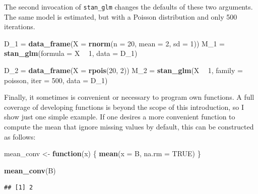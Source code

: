 \documentclass[]{svmono}
\newenvironment{Shaded}{\begin{snugshade}}{\end{snugshade}}
\newcommand{\KeywordTok}[1]{\textcolor[rgb]{0.13,0.29,0.53}{\textbf{#1}}}
\newcommand{\DataTypeTok}[1]{\textcolor[rgb]{0.13,0.29,0.53}{#1}}
\newcommand{\DecValTok}[1]{\textcolor[rgb]{0.00,0.00,0.81}{#1}}
\newcommand{\StringTok}[1]{\textcolor[rgb]{0.31,0.60,0.02}{#1}}
\newcommand{\OtherTok}[1]{\textcolor[rgb]{0.56,0.35,0.01}{#1}}
\newcommand{\ControlFlowTok}[1]{\textcolor[rgb]{0.13,0.29,0.53}{\textbf{#1}}}
\newcommand{\OperatorTok}[1]{\textcolor[rgb]{0.81,0.36,0.00}{\textbf{#1}}}
\newcommand{\NormalTok}[1]{#1}
\begin{document}
The second invocation of \texttt{stan\_glm} changes the defaults of
these two arguments. The same model is estimated, but with a Poisson
distribution and only 500 iterations.

\begin{Shaded}
\begin{Highlighting}[]
\NormalTok{D_}\DecValTok{1}\NormalTok{ =}\StringTok{ }\KeywordTok{data_frame}\NormalTok{(}\DataTypeTok{X =} \KeywordTok{rnorm}\NormalTok{(}\DataTypeTok{n =} \DecValTok{20}\NormalTok{, }\DataTypeTok{mean =} \DecValTok{2}\NormalTok{, }\DataTypeTok{sd =} \DecValTok{1}\NormalTok{))}
\NormalTok{M_}\DecValTok{1}\NormalTok{ =}\StringTok{ }\KeywordTok{stan_glm}\NormalTok{(}\DataTypeTok{formula =}\NormalTok{ X }\OperatorTok{~}\StringTok{ }\DecValTok{1}\NormalTok{, }
               \DataTypeTok{data =}\NormalTok{ D_}\DecValTok{1}\NormalTok{)}

\NormalTok{D_}\DecValTok{2}\NormalTok{ =}\StringTok{ }\KeywordTok{data_frame}\NormalTok{(}\DataTypeTok{X =} \KeywordTok{rpois}\NormalTok{(}\DecValTok{20}\NormalTok{, }\DecValTok{2}\NormalTok{))}
\NormalTok{M_}\DecValTok{2}\NormalTok{ =}\StringTok{ }\KeywordTok{stan_glm}\NormalTok{(X }\OperatorTok{~}\StringTok{ }\DecValTok{1}\NormalTok{,}
               \DataTypeTok{family =}\NormalTok{ poisson,}
               \DataTypeTok{iter =} \DecValTok{500}\NormalTok{,}
               \DataTypeTok{data =}\NormalTok{ D_}\DecValTok{1}\NormalTok{)}
\end{Highlighting}
\end{Shaded}

Finally, it sometimes is convenient or necessary to program own
functions. A full coverage of developing functions is beyond the scope
of this introduction, so I show just one simple example. If one desires
a more convenient function to compute the mean that ignore missing
values by default, this can be constructed as follows:

\begin{Shaded}
\begin{Highlighting}[]
\NormalTok{mean_conv <-}\StringTok{ }\ControlFlowTok{function}\NormalTok{(x) \{}
  \KeywordTok{mean}\NormalTok{(}\DataTypeTok{x =}\NormalTok{ B, }\DataTypeTok{na.rm =} \OtherTok{TRUE}\NormalTok{)}
\NormalTok{\}}

\KeywordTok{mean_conv}\NormalTok{(B)}
\end{Highlighting}
\end{Shaded}

\begin{verbatim}
## [1] 2
\end{verbatim}
\end{document}
